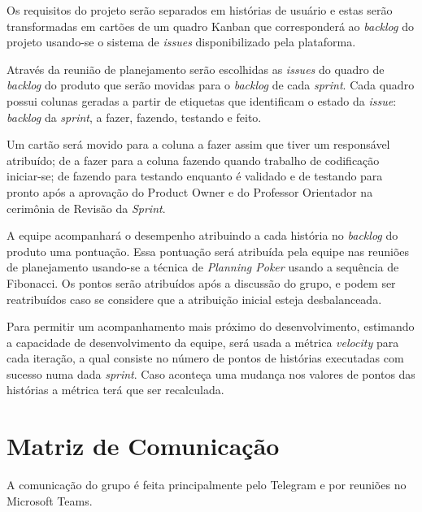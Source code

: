 \documentclass[
	12pt,				%
	oneside,			%
	a4paper,			%
	english,			%
	brazil,				%
	]{abntex2}
\begin{document}
Os requisitos do projeto serão separados em histórias de usuário e estas serão transformadas em cartões de um quadro Kanban que corresponderá ao \textit{backlog} do projeto usando-se o sistema de \textit{issues} disponibilizado pela plataforma.

Através da reunião de planejamento serão escolhidas as \textit{issues} do quadro de \textit{backlog} do produto que serão movidas para o \textit{backlog} de cada \textit{sprint}. Cada quadro possui colunas geradas a partir de etiquetas que identificam o estado da \textit{issue}: \textit{backlog} da \textit{sprint}, a fazer, fazendo, testando e feito.

Um cartão será movido para a coluna a fazer assim que tiver um responsável atribuído; de a fazer para a coluna fazendo quando trabalho de codificação iniciar-se; de fazendo para testando enquanto é validado e de testando para pronto após a aprovação do Product Owner e do Professor Orientador na cerimônia de Revisão da \textit{Sprint}.

A equipe acompanhará o desempenho atribuindo a cada história no \textit{backlog} do produto uma pontuação. Essa pontuação será atribuída pela equipe nas reuniões de planejamento usando-se a técnica de \textit{Planning Poker} \cite{planning_poker} usando a sequência de Fibonacci. Os pontos serão atribuídos após a discussão do grupo, e podem ser reatribuídos caso se considere que a atribuição inicial esteja desbalanceada.

Para permitir um acompanhamento mais próximo do desenvolvimento, estimando a capacidade de desenvolvimento da equipe, será usada a métrica \textit{velocity} para cada iteração, a qual consiste no número de pontos de histórias executadas com sucesso numa dada \textit{sprint}. Caso aconteça uma mudança nos valores de pontos das histórias a métrica terá que ser recalculada.


\section{Matriz de Comunicação}
A comunicação do grupo é feita principalmente pelo Telegram e por reuniões no Microsoft Teams.
\end{document}
